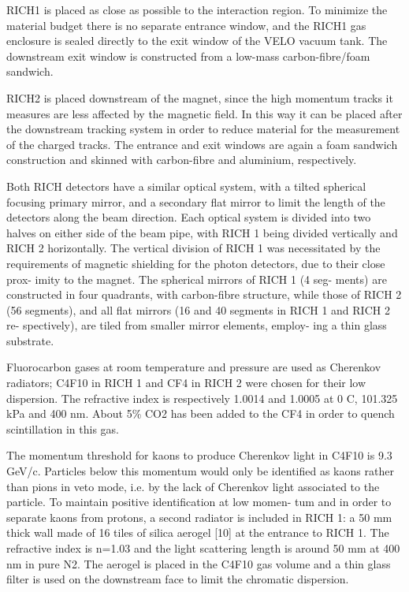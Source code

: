 RICH1 is placed as close as possible to the interaction region. To minimize the material budget there is no separate entrance window, and the RICH1 gas enclosure is sealed directly to the exit window of the VELO vacuum tank. The downstream exit window is constructed from a low-mass carbon-fibre/foam sandwich.

RICH2 is placed downstream of the magnet, since the high momentum tracks it measures are less affected by the magnetic field. In this way it can be placed after the downstream tracking system in order to reduce material for the measurement of the charged tracks. The entrance and exit windows are again a foam sandwich construction and skinned with carbon-fibre and aluminium, respectively.

Both RICH detectors have a similar optical system, with
a tilted spherical focusing primary mirror, and a secondary
flat mirror to limit the length of the detectors along the beam
direction. Each optical system is divided into two halves on
either  side  of  the  beam  pipe,  with  RICH 1  being  divided
vertically and RICH 2 horizontally. The vertical division of
RICH 1 was necessitated by the requirements of magnetic
shielding for the photon detectors, due to their close prox-
imity to the magnet. The spherical mirrors of RICH 1 (4 seg-
ments) are constructed in four quadrants, with carbon-fibre
structure, while those of RICH 2 (56 segments), and all flat
mirrors  (16  and  40  segments  in  RICH 1  and  RICH 2  re-
spectively), are tiled from smaller mirror elements, employ-
ing a thin glass substrate.


Fluorocarbon gases at room temperature and pressure are
used as Cherenkov radiators; C4F10 in RICH 1 and CF4 in
RICH 2 were chosen for their low dispersion. The refractive
index is respectively 1.0014 and 1.0005 at 0 C, 101.325 kPa
and 400 nm. About 5\% CO2 has been added to the CF4 in
order to quench scintillation in this gas.

The momentum threshold for kaons to produce Cherenkov
light in C4F10 is 9.3 GeV/c. Particles below this momentum
would only be identified as kaons rather than pions in veto
mode, i.e. by the lack of Cherenkov light associated to the
particle. To maintain positive identification at low momen-
tum and in order to separate kaons from protons, a second
radiator is included in RICH 1: a 50 mm thick wall made of
16 tiles of silica aerogel [10] at the entrance to RICH 1. The
refractive index is n=1.03 and the light scattering length is
around 50 mm at 400 nm in pure N2. The aerogel is placed
in the C4F10 gas volume and a thin glass filter is used on the
downstream face to limit the chromatic dispersion.

